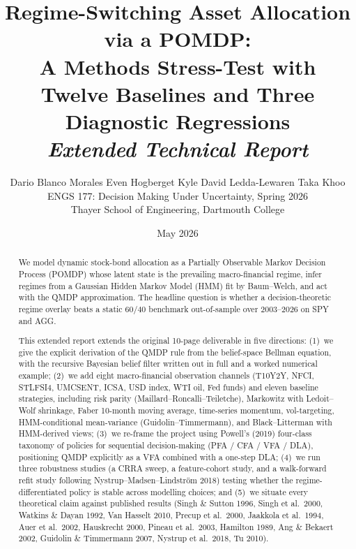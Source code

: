 \documentclass[11pt]{article}
\title{
  \Large \textbf{Regime-Switching Asset Allocation via a POMDP:\\
   A Methods Stress-Test with Twelve Baselines and Three Diagnostic Regressions} \\[3pt]
  \normalsize \textit{Extended Technical Report}
}
\author{
  Dario Blanco Morales \quad Even Hogberget \quad Kyle David Ledda-Lewaren \quad Taka Khoo \\[2pt]
  \small ENGS 177: Decision Making Under Uncertainty, Spring 2026 \\
  \small Thayer School of Engineering, Dartmouth College
}
\date{May 2026}
\theoremstyle{plain1}
\theoremstyle{definition1}
\newcommand{\1}{\mathbf{1}}
\begin{document}
\maketitle

\begin{abstract}\noindent
We model dynamic stock-bond allocation as a Partially Observable Markov Decision Process (POMDP) whose latent state is the prevailing macro-financial regime, infer regimes from a Gaussian Hidden Markov Model (HMM) fit by Baum--Welch, and act with the QMDP approximation. The headline question is whether a decision-theoretic regime overlay beats a static $60/40$ benchmark out-of-sample over $2003$--$2026$ on SPY and AGG.

This extended report extends the original 10-page deliverable in five directions:
(1)~we give the explicit derivation of the QMDP rule from the belief-space Bellman equation, with the recursive Bayesian belief filter written out in full and a worked numerical example;
(2)~we add eight macro-financial observation channels (T10Y2Y, NFCI, STLFSI4, UMCSENT, ICSA, USD index, WTI oil, Fed funds) and eleven baseline strategies, including risk parity (Maillard--Roncalli--Teiletche), Markowitz with Ledoit--Wolf shrinkage, Faber 10-month moving average, time-series momentum, vol-targeting, HMM-conditional mean-variance (Guidolin--Timmermann), and Black--Litterman with HMM-derived views;
(3)~we re-frame the project using Powell's (2019) four-class taxonomy of policies for sequential decision-making (PFA / CFA / VFA / DLA), positioning QMDP explicitly as a VFA combined with a one-step DLA;
(4)~we run three robustness studies (a CRRA sweep, a feature-cohort study, and a walk-forward refit study following Nystrup--Madsen--Lindstr\"om 2018) testing whether the regime-differentiated policy is stable across modelling choices; and
(5)~we situate every theoretical claim against published results (Singh \& Sutton 1996, Singh et al.\ 2000, Watkins \& Dayan 1992, Van Hasselt 2010, Precup et al.\ 2000, Jaakkola et al.\ 1994, Auer et al.\ 2002, Hauskrecht 2000, Pineau et al.\ 2003, Hamilton 1989, Ang \& Bekaert 2002, Guidolin \& Timmermann 2007, Nystrup et al.\ 2018, Tu 2010).


\end{abstract}
\end{document}
